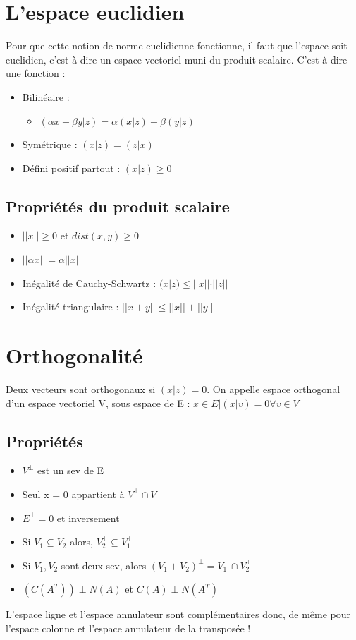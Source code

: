 \documentclass[a4paper]{book}
\begin{document}
\section{L'espace euclidien}
Pour que cette notion de norme euclidienne fonctionne, il faut que l'espace soit euclidien, c'est-à-dire un espace vectoriel muni du produit scalaire. C'est-à-dire une fonction :
\begin{itemize}
    \item Bilinéaire :
    \begin{itemize}
        \item $(\alpha x + \beta y | z) = \alpha (x|z) + \beta (y|z)$
    \end{itemize}
    \item Symétrique : $(x|z) = (z|x)$
    \item Défini positif partout : $(x|z) \geq 0$
\end{itemize}
\subsection{Propriétés du produit scalaire}
\begin{itemize}
    \item $||x|| \geq 0$ et $dist(x,y) \geq 0$
    \item $||\alpha x|| = \alpha ||x||$
    \item Inégalité de Cauchy-Schwartz : $(x|z) \leq ||x||\cdot ||z||$
    \item Inégalité triangulaire : $||x+y|| \leq ||x|| + ||y||$
\end{itemize}
\section{Orthogonalité}
Deux vecteurs sont orthogonaux si $(x|z) = 0$. On appelle espace orthogonal d'un espace vectoriel V, sous espace de E : ${x \in E| (x|v)=0 \forall v \in V}$
\subsection{Propriétés}
\begin{itemize}
    \item $V^\perp$ est un sev de E
    \item Seul x = 0 appartient à $V^\perp \cap V$
    \item $E^\perp = 0$ et inversement
    \item Si $V_1 \subseteq V_2$ alors, $V_2^\perp \subseteq V_1^\perp$
    \item Si $V_1,V_2$ sont deux sev, alors $(V_1+V_2)^\perp = V_1^\perp \cap V_2^\perp$
    \item $(C(A^T)) \perp N(A)$ et $C(A) \perp N(A^T)$
\end{itemize}
L'espace ligne et l'espace annulateur sont complémentaires donc, de même pour l'espace colonne et l'espace annulateur de la transposée !
\end{document}
